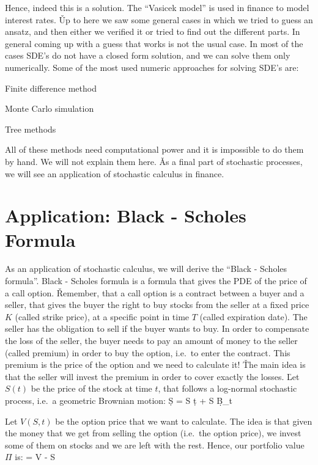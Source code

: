 Hence, indeed this is a solution. The ``Vasicek model'' is used in finance to model interest rates. \v

Up to here we saw some general cases in which we tried to guess an ansatz, and then either we verified it or tried
to find out the different parts. In general coming up with a guess that works is not the usual case. In most of the
cases SDE's do not have a closed form solution, and we can solve them only numerically. Some of the most used
numeric approaches for solving SDE's are:
\ben
\item Finite difference method
\item Monte Carlo simulation
\item Tree methods
\een

All of these methods need computational power and it is impossible to do them by hand. We will not explain them
here. \v

As a final part of stochastic processes, we will see an application of stochastic calculus in finance.

\section{Application: Black - Scholes Formula}

As an application of stochastic calculus, we will derive the ``Black - Scholes formula''. Black - Scholes formula
is a formula that gives the PDE of the price of a call option. \v

Remember, that a call option is a contract between a buyer and a seller, that gives the buyer the right to buy
stocks from the seller at a fixed price $K$ (called strike price), at a specific point in time $T$ (called
expiration date). The seller has the obligation to sell if the buyer wants to buy. In order to compensate the loss
of the seller, the buyer needs to pay an amount of money to the seller (called premium) in order to buy the option,
i.e.\ to enter the contract. This premium is the price of the option and we need to calculate it! \v

The main idea is that the seller will invest the premium in order to cover exactly the losses. \v

Let $S(t)$ be the price of the stock at time $t$, that follows a log-normal stochastic process, i.e.\ a geometric
Brownian motion:
\bse
\d S = \mu S \: \d t + \sigma S \: \d B_{t}
\ese

Let $V(S, t)$ be the option price that we want to calculate. The idea is that given the money that we get from
selling the option (i.e.\ the option price), we invest some of them on stocks and we are left with the rest. Hence,
our portfolio value $\Pi$ is:
\bse
\Pi = V - \Delta \cdot S
\ese

